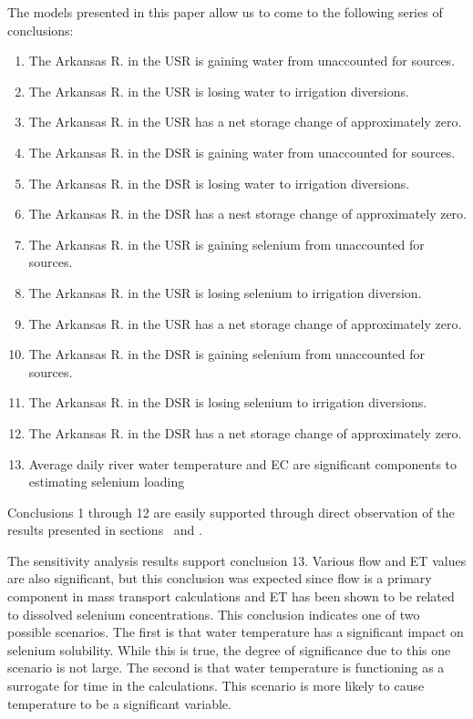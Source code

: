 \begin{linenumbers}[1]
The models presented in this paper allow us to come to the following series of conclusions:
\begin{enumerate}
\item The Arkansas R. in the USR is gaining water from unaccounted for sources.%
\item The Arkansas R. in the USR is losing water to irrigation diversions.%
\item The Arkansas R. in the USR has a net storage change of approximately zero.%
\item The Arkansas R. in the DSR is gaining water from unaccounted for sources.%
\item The Arkansas R. in the DSR is losing water to irrigation diversions.%
\item The Arkansas R. in the DSR has a nest storage change of approximately zero.%
\item The Arkansas R. in the USR is gaining selenium from unaccounted for sources.%
\item The Arkansas R. in the USR is losing selenium to irrigation diversion.%
\item The Arkansas R. in the USR has a net storage change of approximately zero.%
\item The Arkansas R. in the DSR is gaining selenium from unaccounted for sources.%
\item The Arkansas R. in the DSR is losing selenium to irrigation diversions.%
\item The Arkansas R. in the DSR has a net storage change of approximately zero.%
\item Average daily river water temperature and EC are significant components to estimating selenium loading%
\end{enumerate}

Conclusions 1 through 12 are easily supported through direct observation of the results presented in sections~\label{sec:IRStoredWater} and \label{sec:Results} .

The sensitivity analysis results support conclusion 13.  Various flow and ET values are also significant, but this conclusion was expected since flow is a primary component in mass transport calculations and ET has been shown to be related to dissolved selenium concentrations.  This conclusion indicates one of two possible scenarios.  The first is that water temperature has a significant impact on selenium solubility.  While this is true, the degree of significance due to this one scenario is not large.  The second is that water temperature is functioning as a surrogate for time in the calculations.  This scenario is more likely to cause temperature to be a significant variable.


\end{linenumbers}
